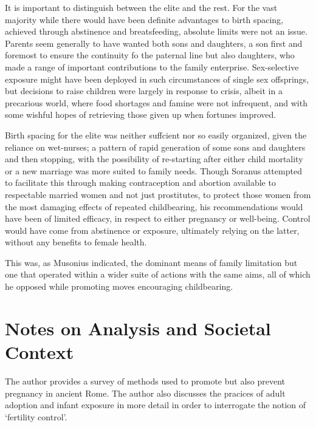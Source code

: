 It is important to distinguish between the elite and the rest. For the vast majority while there would have been definite advantages to birth spacing, achieved through abstinence and breatsfeeding, absolute limits were not an issue. Parents seem generally to have wanted both sons and daughters, a son first and foremost to ensure the continuity fo the paternal line but also daughters, who made a range of important contributions to the family enterprise. Sex-selective exposure might have been deployed in such circumstances of single sex offsprings, but decisions to raise children were largely in response to crisis, albeit in a precarious world, where food shortages and famine were not infrequent, and with some wishful hopes of retrieving those given up when fortunes improved.

Birth spacing for the elite was neither suffcient nor so easily organized, given the reliance on wet-nurses; a pattern of rapid generation of some sons and daughters and then stopping, with the possibility of re-starting after either child mortality or a new marriage was more suited to family needs. Though Soranus attempted to facilitate this through making contraception and abortion available to respectable married women and not just prostitutes, to protect those women from the most damaging effects of repeated childbearing, his recommendations would have been of limited efficacy, in respect to either pregnancy or well-being. Control would have come from abstinence or exposure, ultimately relying on the latter, without any benefits to female health. 

\begin{rmk}
    This was, as Musonius indicated, the dominant means of family limitation but one that operated within a wider suite of actions with the same aims, all of which he opposed while promoting moves encouraging childbearing.
\end{rmk}





\section{Notes on Analysis and Societal Context}
\label{sec:SocCont6}


The author provides a survey of methods used to promote but also prevent pregnancy in ancient Rome. The author also discusses the pracices of adult adoption and infant exposure in more detail in order to interrogate the notion of `fertility control'.


